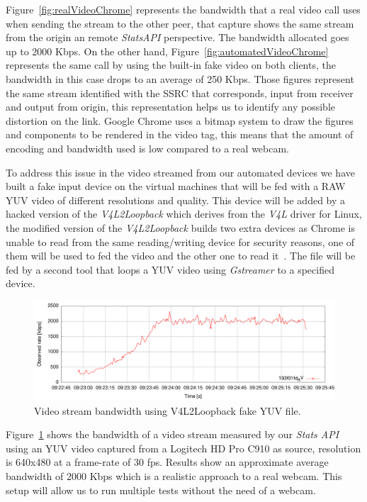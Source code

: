 Figure~\ref{fig:realVideoChrome} represents the bandwidth that a real video call uses when sending the stream to the other peer, that capture shows the same stream from the origin an remote {\it StatsAPI} perspective. The bandwidth allocated goes up to 2000 Kbps. On the other hand, Figure~\ref{fig:automatedVideoChrome} represents the same call by using the built-in fake video on both clients, the bandwidth in this case drops to an average of 250 Kbps. Those figures represent the same stream identified with the SSRC that corresponds, input from receiver and output from origin, this representation helps us to identify any possible distortion on the link. Google Chrome uses a bitmap system to draw the figures and components to be rendered in the video tag, this means that the amount of encoding and bandwidth used is low compared to a real webcam.

To address this issue in the video streamed from our automated devices we have built a fake input device on the virtual machines that will be fed with a RAW YUV video of different resolutions and quality. This device will be added by a hacked version of the {\it V4L2Loopback} which derives from the {\it V4L} driver for Linux, the modified version of the {\it V4L2Loopback} builds two extra devices as Chrome is unable to read from the same reading/writing device for security reasons, one of them will be used to fed the video and the other one to read it~\cite{chromiumIssue142568}. The file will be fed by a second tool that loops a YUV video using {\it Gstreamer} to a specified device.

 \begin{figure}[h]
  \centering
    \includegraphics[width=1\textwidth]{./figures/testV4L2niklas.pdf}
      \caption[Video stream bandwidth using V4L2Loopback fake YUV file]{Video stream bandwidth using V4L2Loopback fake YUV file.}
	\label{fig:testV4L2niklas}
\end{figure}

Figure~\ref{fig:testV4L2niklas} shows the bandwidth of a video stream measured by our {\it Stats API} using an YUV video captured from a Logitech HD Pro C910 as source, resolution is 640x480 at a frame-rate of 30 fps. Results show an approximate average bandwidth of 2000 Kbps which is a realistic approach to a real webcam. This setup will allow us to run multiple tests without the need of a webcam.